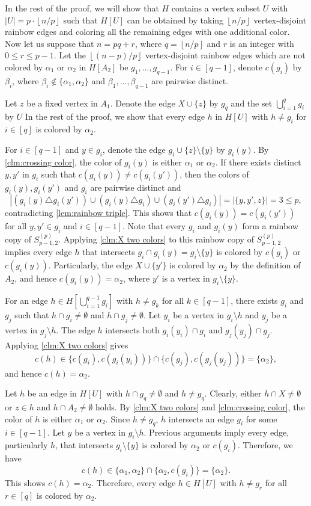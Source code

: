 \documentclass[10pt,a4paper]{article}
\theoremstyle{definition}
\newcommand{\floor}[1]{\left\lfloor #1 \right\rfloor}
\begin{document}
In the rest of the proof, we will show that $H$ contains a vertex subset $U$ with $|U|=p\cdot\floor{n/p}$ such that $H[U]$ can be obtained by taking $\floor{n/p}$ vertex-disjoint rainbow edges and coloring all the remaining edges with one additional color.
Now let us suppose that $n=pq+r$, where $q=\floor{n/p}$ and $r$ is an integer with $0\le r\le p-1$.
Let the $\floor{(n-p)/p}$ vertex-disjoint rainbow edges which are not colored by $\alpha_1$ or $\alpha_2$ in $H[A_2]$ be $g_1,\ldots,g_{q-1}$.
For $i\in[q-1]$, denote $c(g_i)$ by $\beta_i$, where $\beta_i\notin\{\alpha_1,\alpha_2\}$ and $\beta_1,\ldots,\beta_{q-1}$ are pairwise distinct.

Let $z$ be a fixed vertex in $A_1$.
Denote the edge $X\cup\{z\}$ by $g_q$ and the set $\bigcup_{i=1}^q g_{i}$ by $U$
In the rest of the proof, we show that every edge $h$ in $H[U]$ with $h\ne g_i$ for $i\in[q]$ is colored by $\alpha_2$.

For $i\in[q-1]$ and $y\in g_i$, denote the edge $g_i\cup\{z\}\setminus\{y\}$ by $g_i(y)$.
By \cref{clm:crossing color}, the color of $g_i(y)$ is either $\alpha_1$ or $\alpha_2$.
If there exists distinct $y,y'$ in $g_i$ such that $c(g_i(y))\ne c(g_i(y'))$, then the colors of $g_i(y),g_i(y')$ and $g_i$ are pairwise distinct and
\[
    |(g_i(y)\triangle g_i(y')) \cup (g_i(y) \triangle g_i) \cup (g_i(y')\triangle g_i)| = |\{y,y',z\}|=3 \le p,
\]
contradicting \cref{lem:rainbow triple}.
This shows that $c(g_i(y))=c(g_i(y'))$ for all $y,y'\in g_i$ and $i\in[q-1]$.
Note that every $g_i$ and $g_i(y)$ form a rainbow copy of $S_{p-1,2}^{(p)}$.
Applying \cref{clm:X two colors} to this rainbow copy of $S_{p-1,2}^{(p)}$ implies every edge $h$ that intersects $g_i\cap g_i(y)=g_i\setminus\{y\}$ is colored by $c(g_i)$ or $c(g_i(y))$.
Particularly, the edge $X\cup\{y'\}$ is colored by $\alpha_2$ by the definition of $A_2$, and hence $c(g_i(y))=\alpha_2$, where $y'$ is a vertex in $g_i\setminus\{y\}$.

For an edge $h\in H[\bigcup_{i=1}^{q-1} g_i]$ with $h\ne g_k$ for all $k\in[q-1]$, there exists $g_i$ and $g_j$ such that $h\cap g_i\ne\emptyset$ and $h\cap g_j\ne\emptyset$.
Let $y_i$ be a vertex in $g_i\setminus h$ and $y_j$ be a vertex in $g_j\setminus h$.
The edge $h$ intersects both $g_i(y_i)\cap g_i$ and $g_j(y_j)\cap g_j$.
Applying \cref{clm:X two colors} gives
\[
    c(h)\in \{c(g_i),c(g_i(y_i))\}\cap \{c(g_j),c(g_j(y_j))\}=\{\alpha_2\},
\]
and hence $c(h)=\alpha_2$.

Let $h$ be an edge in $H[U]$ with $h\cap g_q\ne\emptyset$ and $h\ne g_q$.
Clearly, either $h\cap X\ne\emptyset$ or $z\in h$ and $h\cap A_2\ne\emptyset$ holds.
By \cref{clm:X two colors} and \cref{clm:crossing color}, the color of $h$ is either $\alpha_1$ or $\alpha_2$.
Since $h\ne g_q$, $h$ intersects an edge $g_i$ for some $i\in[q-1]$.
Let $y$ be a vertex in $g_i\setminus h$.
Previous arguments imply every edge, particularly $h$, that intersects $g_i\setminus \{y\}$ is colored by $\alpha_2$ or $c(g_i)$.
Therefore, we have
\[
    c(h)\in\{\alpha_1,\alpha_2\}\cap \{\alpha_2,c(g_i)\}=\{\alpha_2\}.
\]
This shows $c(h)=\alpha_2$.
Therefore, every edge $h\in H[U]$ with $h\neq g_r$ for all $r\in[q]$ is colored by $\alpha_2$.
\end{document}
